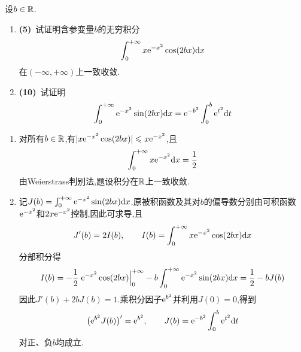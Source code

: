 \documentclass{ctexart}
\begin{document}
\begin{problem}[7.(15\songti{分})]
设$b\in\mathbb{R}$.
        \begin{enumerate}[label=\tbf{(\arabic*)},topsep=0pt,parsep=0pt,itemsep=0pt,partopsep=0pt]
            \item \textbf{(5)}\ 试证明含参变量$b$的无穷积分
                \[\int_0^{+\infty}x\mathrm{e}^{-x^2}\cos(2bx)\mathrm{d} x\]
                在$(-\infty,+\infty)$上一致收敛.
            \item \textbf{(10)}\ 试证明
                \[\int_0^{+\infty}\mathrm{e}^{-x^2}\sin(2bx)\mathrm{d} x=\mathrm{e}^{-b^2}\int_0^b\mathrm{e}^{t^2}\mathrm{d} t\]
        \end{enumerate}
\end{problem}
\begin{solution}
\begin{enumerate}[label=\tbf{(\arabic*)},topsep=0pt,parsep=0pt,itemsep=0pt,partopsep=0pt]
\item 对所有$b\in\mathbb{R}$,有$|x\mathrm{e}^{-x^2}\cos(2bx)|\leqslant x\mathrm{e}^{-x^2}$,且
\[\int_0^{+\infty}x\mathrm{e}^{-x^2}\mathrm{d} x=\frac12\]
由Weierstrass判别法,题设积分在$\mathbb{R}$上一致收敛.
\item 记$J(b)=\int_0^{+\infty}\mathrm{e}^{-x^2}\sin(2bx)\mathrm{d} x$.原被积函数及其对$b$的偏导数分别由可积函数$\mathrm{e}^{-x^2}$和$2x\mathrm{e}^{-x^2}$控制,因此可求导,且
\[J'(b)=2I(b),\qquad I(b)=\int_0^{+\infty}x\mathrm{e}^{-x^2}\cos(2bx)\mathrm{d} x\]
分部积分得
\[I(b)=-\frac12\left.\mathrm{e}^{-x^2}\cos(2bx)\right|_0^{+\infty}
-b\int_0^{+\infty}\mathrm{e}^{-x^2}\sin(2bx)\mathrm{d} x=\frac12-bJ(b)\]
因此$J'(b)+2bJ(b)=1$.乘积分因子$\mathrm{e}^{b^2}$并利用$J(0)=0$,得到
\[\bigl(\mathrm{e}^{b^2}J(b)\bigr)'=\mathrm{e}^{b^2},\qquad
J(b)=\mathrm{e}^{-b^2}\int_0^b\mathrm{e}^{t^2}\mathrm{d} t\]
对正、负$b$均成立.
\end{enumerate}
\end{solution}
\end{document}
